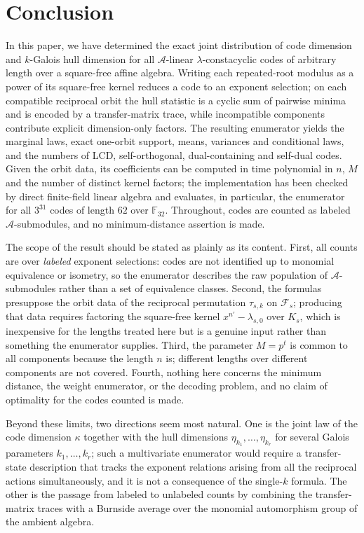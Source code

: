 \documentclass[preprint,12pt,a4paper]{elsarticle}
\newcommand{\F}{\mathbb F}
\newcommand{\A}{\mathcal A}
\newcommand{\Fs}{\mathcal F_s}
\theoremstyle{definition}
\theoremstyle{remark}
\begin{document}
\section{Conclusion}\label{sec:conclusions}
In this paper, we have determined the exact joint distribution of code dimension and
$k$-Galois hull dimension for all $\A$-linear $\lambda$-constacyclic codes
of arbitrary length over a square-free affine algebra. Writing each
repeated-root modulus as a power of its square-free kernel reduces a code to
an exponent selection; on each compatible reciprocal orbit the hull statistic
is a cyclic sum of pairwise minima and is encoded by a transfer-matrix trace,
while incompatible components contribute explicit dimension-only factors. The
resulting enumerator yields the marginal laws, exact one-orbit support,
means, variances and conditional laws, and the numbers of LCD,
self-orthogonal, dual-containing and self-dual codes. Given the orbit data,
its coefficients can be computed in time polynomial in $n$, $M$ and the
number of distinct kernel factors; the implementation has been checked by
direct finite-field linear algebra and evaluates, in particular, the
enumerator for all $3^{31}$ codes of length $62$ over $\F_{32}$. Throughout,
codes are counted as labeled $\A$-submodules, and no minimum-distance
assertion is made.

The scope of the result should be stated as plainly as its content. First, all
counts are over \emph{labeled} exponent selections: codes are not identified up
to monomial equivalence or isometry, so the enumerator describes the raw
population of $\A$-submodules rather than a set of equivalence classes.
Second, the formulas presuppose the orbit data of the reciprocal permutation
$\tau_{s,k}$ on $\Fs$; producing that data requires factoring the square-free
kernel $x^{n'}-\lambda_{s,0}$ over $K_s$, which is inexpensive for the lengths
treated here but is a genuine input rather than something the enumerator
supplies. Third, the parameter $M=p^t$ is common to all components because the
length $n$ is; different lengths over different components are not covered.
Fourth, nothing here concerns the minimum distance, the weight enumerator, or
the decoding problem, and no claim of optimality for the codes counted is made.

Beyond these limits, two directions seem most natural. One is the joint law of
the code dimension $\kappa$ together with the hull dimensions
$\eta_{k_1},\ldots,\eta_{k_r}$ for several Galois parameters
$k_1,\ldots,k_r$; such a multivariate enumerator would require a transfer-state
description that tracks the exponent relations arising from all the reciprocal
actions simultaneously, and it is not a consequence of the single-$k$ formula.
The other is the passage from labeled to unlabeled counts by combining the
transfer-matrix traces with a Burnside average over the monomial automorphism
group of the ambient algebra.
\end{document}
